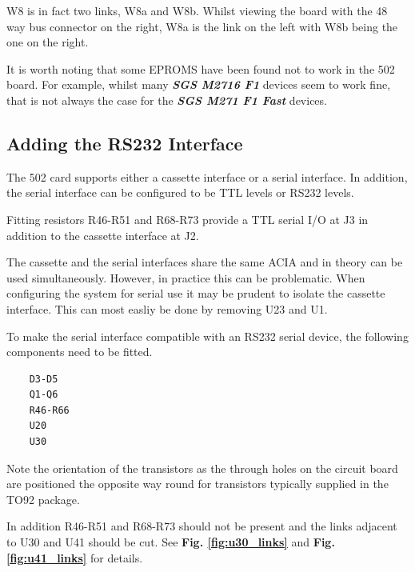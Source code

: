 W8 is in fact two links, W8a and W8b. Whilst viewing the board with the 48 way bus connector on the right, W8a is the link on the left with W8b being the one on the right.

It is worth noting that some EPROMS have been found not to work in the 502 board. For example, whilst many \emph{\textbf{SGS M2716 F1}} devices seem to work fine, that is not always the case for the \emph{\textbf{SGS M271 F1 Fast}} devices.

\subsection{Adding the RS232 Interface}

The 502 card supports either a cassette interface or a serial interface. In addition, the serial interface can be configured to be TTL levels or RS232 levels.

Fitting resistors R46-R51 and R68-R73 provide a TTL serial I/O at J3 in addition to the cassette interface at J2.

The cassette and the serial interfaces share the same ACIA and in theory can be used simultaneously. However, in practice this can be problematic. When configuring the system for serial use it may be prudent to isolate the cassette interface. This can most easliy be done by removing U23 and U1.

To make the serial interface compatible with an RS232 serial device, the following components need to be fitted.

\begin{verbatim}
    D3-D5
    Q1-Q6
    R46-R66
    U20
    U30
\end{verbatim}

Note the orientation of the transistors as the through holes on the circuit board are positioned the opposite way round for transistors typically supplied in the TO92 package.

In addition R46-R51 and R68-R73 should not be present and the links adjacent to U30 and U41 should be cut. See \textbf{Fig. \ref{fig:u30_links}} and \textbf{Fig. \ref{fig:u41_links}} for details.

